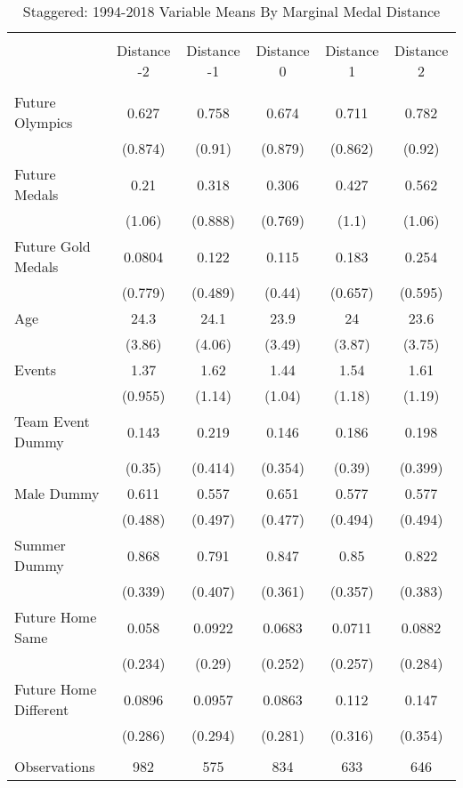 
\begin{table}[!htbp] \centering 
  \renewcommand\thetable{A3}
  \caption{Staggered: 1994-2018 Variable Means By Marginal Medal Distance} 
  \label{} 
\small 
\begin{tabular}{@{\extracolsep{5pt}} lccccc} 
\\[-1.8ex]\hline \\[-1.8ex] 
 & Distance -2 & Distance -1 & Distance 0 & Distance 1 & Distance 2 \\ 
\hline 
\hline \\[-1.8ex] 
Future Olympics & 0.627 & 0.758 & 0.674 & 0.711 & 0.782 \\ 
 & (0.874) & (0.91) & (0.879) & (0.862) & (0.92) \\ 
Future Medals & 0.21 & 0.318 & 0.306 & 0.427 & 0.562 \\ 
  & (1.06) & (0.888) & (0.769) & (1.1) & (1.06) \\ 
Future Gold Medals & 0.0804 & 0.122 & 0.115 & 0.183 & 0.254 \\ 
   & (0.779) & (0.489) & (0.44) & (0.657) & (0.595) \\ 
Age & 24.3 & 24.1 & 23.9 & 24 & 23.6 \\ 
    & (3.86) & (4.06) & (3.49) & (3.87) & (3.75) \\ 
Events & 1.37 & 1.62 & 1.44 & 1.54 & 1.61 \\ 
     & (0.955) & (1.14) & (1.04) & (1.18) & (1.19) \\ 
Team Event Dummy & 0.143 & 0.219 & 0.146 & 0.186 & 0.198 \\ 
      & (0.35) & (0.414) & (0.354) & (0.39) & (0.399) \\ 
Male Dummy & 0.611 & 0.557 & 0.651 & 0.577 & 0.577 \\ 
       & (0.488) & (0.497) & (0.477) & (0.494) & (0.494) \\ 
Summer Dummy & 0.868 & 0.791 & 0.847 & 0.85 & 0.822 \\ 
        & (0.339) & (0.407) & (0.361) & (0.357) & (0.383) \\ 
Future Home Same & 0.058 & 0.0922 & 0.0683 & 0.0711 & 0.0882 \\ 
         & (0.234) & (0.29) & (0.252) & (0.257) & (0.284) \\ 
Future Home Different & 0.0896 & 0.0957 & 0.0863 & 0.112 & 0.147 \\ 
          & (0.286) & (0.294) & (0.281) & (0.316) & (0.354) \\ 
           &  &  &  &  &  \\ 
Observations & 982 & 575 & 834 & 633 & 646 \\ 

\end{tabular}
\end{table}
